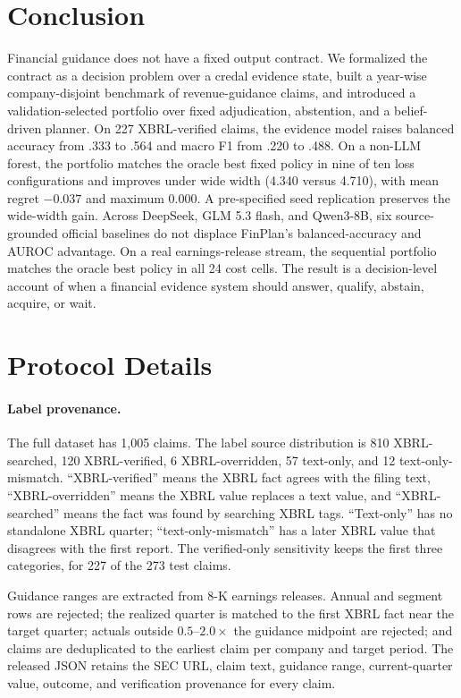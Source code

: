\documentclass[11pt]{article}
\newcommand{\method}{FinPlan}
\begin{document}
\section{Conclusion}
Financial guidance does not have a fixed output contract. We formalized the contract as a decision problem over a credal evidence state, built a year-wise company-disjoint benchmark of revenue-guidance claims, and introduced a validation-selected portfolio over fixed adjudication, abstention, and a belief-driven planner. On 227 XBRL-verified claims, the evidence model raises balanced accuracy from .333 to .564 and macro F1 from .220 to .488. On a non-LLM forest, the portfolio matches the oracle best fixed policy in nine of ten loss configurations and improves under wide width (4.340 versus 4.710), with mean regret $-0.037$ and maximum $0.000$. A pre-specified seed replication preserves the wide-width gain. Across DeepSeek, GLM 5.3 flash, and Qwen3-8B, six source-grounded official baselines do not displace \method's balanced-accuracy and AUROC advantage. On a real earnings-release stream, the sequential portfolio matches the oracle best policy in all 24 cost cells. The result is a decision-level account of when a financial evidence system should answer, qualify, abstain, acquire, or wait.



\appendix

\section{Protocol Details}
\label{app:protocol}

\paragraph{Label provenance.}
The full dataset has 1,005 claims. The label source distribution is 810 XBRL-searched, 120 XBRL-verified, 6 XBRL-overridden, 57 text-only, and 12 text-only-mismatch. ``XBRL-verified'' means the XBRL fact agrees with the filing text, ``XBRL-overridden'' means the XBRL value replaces a text value, and ``XBRL-searched'' means the fact was found by searching XBRL tags. ``Text-only'' has no standalone XBRL quarter; ``text-only-mismatch'' has a later XBRL value that disagrees with the first report. The verified-only sensitivity keeps the first three categories, for 227 of the 273 test claims.

Guidance ranges are extracted from 8-K earnings releases. Annual and segment rows are rejected; the realized quarter is matched to the first XBRL fact near the target quarter; actuals outside $0.5$--$2.0\times$ the guidance midpoint are rejected; and claims are deduplicated to the earliest claim per company and target period. The released JSON retains the SEC URL, claim text, guidance range, current-quarter value, outcome, and verification provenance for every claim.
\end{document}
